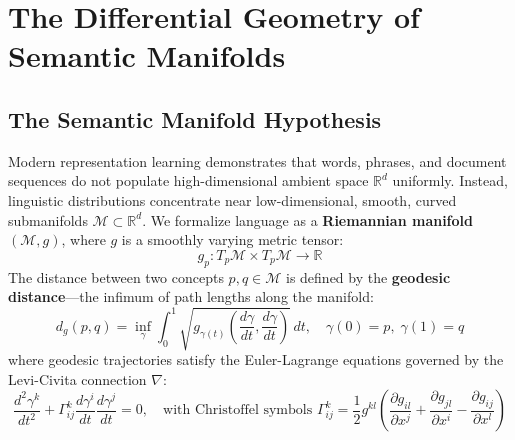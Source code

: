 \documentclass[11pt,letterpaper]{article}
\begin{document}
\section{The Differential Geometry of Semantic Manifolds}

\subsection{The Semantic Manifold Hypothesis}
Modern representation learning demonstrates that words, phrases, and document sequences do not populate high-dimensional ambient space $\mathbb{R}^d$ uniformly. Instead, linguistic distributions concentrate near low-dimensional, smooth, curved submanifolds $\mathcal{M} \subset \mathbb{R}^d$. We formalize language as a \textbf{Riemannian manifold} $(\mathcal{M}, g)$, where $g$ is a smoothly varying metric tensor:
\begin{equation}
g_p: T_p\mathcal{M} \times T_p\mathcal{M} \longrightarrow \mathbb{R}
\end{equation}
The distance between two concepts $p, q \in \mathcal{M}$ is defined by the \textbf{geodesic distance}---the infimum of path lengths along the manifold:
\begin{equation}
d_g(p, q) = \inf_{\gamma} \int_0^1 \sqrt{g_{\gamma(t)}\left(\frac{d\gamma}{dt}, \frac{d\gamma}{dt}\right)} \, dt, \quad \gamma(0) = p, \; \gamma(1) = q
\end{equation}
where geodesic trajectories satisfy the Euler-Lagrange equations governed by the Levi-Civita connection $\nabla$:
\begin{equation}
\frac{d^2 \gamma^k}{dt^2} + \Gamma_{ij}^k \frac{d\gamma^i}{dt} \frac{d\gamma^j}{dt} = 0, \quad \text{with Christoffel symbols } \Gamma_{ij}^k = \frac{1}{2} g^{kl} \left( \frac{\partial g_{il}}{\partial x^j} + \frac{\partial g_{jl}}{\partial x^i} - \frac{\partial g_{ij}}{\partial x^l} \right)
\end{equation}
\end{document}
